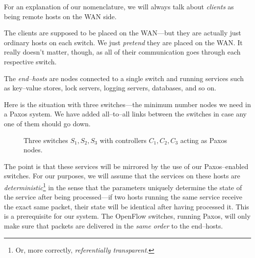 For an explanation of our nomenclature, we will always talk about
\textit{clients} as being remote hosts on the \ac{WAN} side.

The clients are supposed to be placed on the \ac{WAN}---but they are actually
just ordinary hosts on each switch.  We just \textit{pretend} they are
placed on the WAN.  It really doesn't matter, though, as all of their
communication goes through each respective switch.

The \textit{end--hosts} are nodes connected to a single switch and running
services such as key--value stores, lock servers, logging servers,
databases, and so on.

Here is the situation with three switches---the minimum number nodes we need
in a Paxos system.  We have added all--to--all links between the switches in
case any one of them should go down.

\begin{figure}[H]
  \centering
  \caption{Three switches $S_1, S_2, S_3$ with controllers $C_1, C_2, C_3$ acting as Paxos nodes.}
  \label{figure:graph.three.switches}
\end{figure}

The point is that these services will be mirrored by the use of our
Paxos--enabled switches.  For our purposes, we will assume that the services
on these hosts are \textit{deterministic}\footnote{Or, more correctly,
\textit{referentially transparent}.} in the sense that the parameters
uniquely determine the state of the service after being processed---if two
hosts running the same service receive the exact same packet, their state
will be identical after having processed it.  This is a prerequisite for our
system.  The OpenFlow switches, running Paxos, will only make sure that
packets are delivered in the \textit{same order} to the end--hosts.

